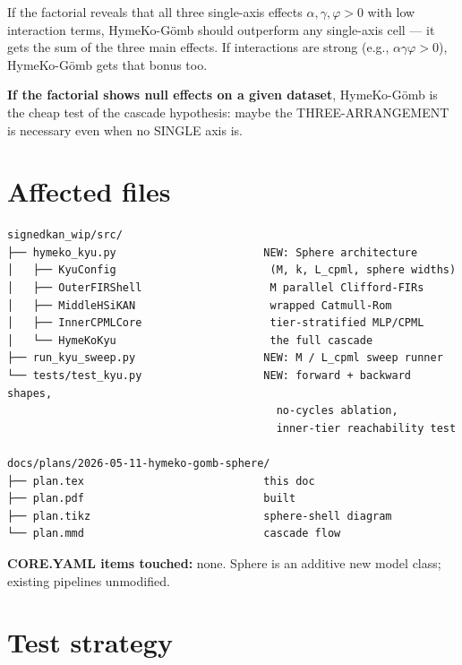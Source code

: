 \documentclass[11pt]{article}
\begin{document}
If the factorial reveals that all three single-axis effects
$\alpha, \gamma, \varphi > 0$ with low interaction terms, HymeKo-Gömb
should outperform any single-axis cell --- it gets the sum of the
three main effects. If interactions are strong (e.g., $\alpha\gamma\varphi > 0$),
HymeKo-Gömb gets that bonus too.

\textbf{If the factorial shows null effects on a given dataset},
HymeKo-Gömb is the cheap test of the cascade hypothesis: maybe the
THREE-ARRANGEMENT is necessary even when no SINGLE axis is.

\section{Affected files}

\begin{lstlisting}
signedkan_wip/src/
├── hymeko_kyu.py                       NEW: Sphere architecture
│   ├── KyuConfig                        (M, k, L_cpml, sphere widths)
│   ├── OuterFIRShell                    M parallel Clifford-FIRs
│   ├── MiddleHSiKAN                     wrapped Catmull-Rom
│   ├── InnerCPMLCore                    tier-stratified MLP/CPML
│   └── HymeKoKyu                        the full cascade
├── run_kyu_sweep.py                    NEW: M / L_cpml sweep runner
└── tests/test_kyu.py                   NEW: forward + backward shapes,
                                          no-cycles ablation,
                                          inner-tier reachability test

docs/plans/2026-05-11-hymeko-gomb-sphere/
├── plan.tex                            this doc
├── plan.pdf                            built
├── plan.tikz                           sphere-shell diagram
└── plan.mmd                            cascade flow
\end{lstlisting}

\textbf{CORE.YAML items touched:} none. Sphere is an additive new
model class; existing pipelines unmodified.

\section{Test strategy}
\end{document}
